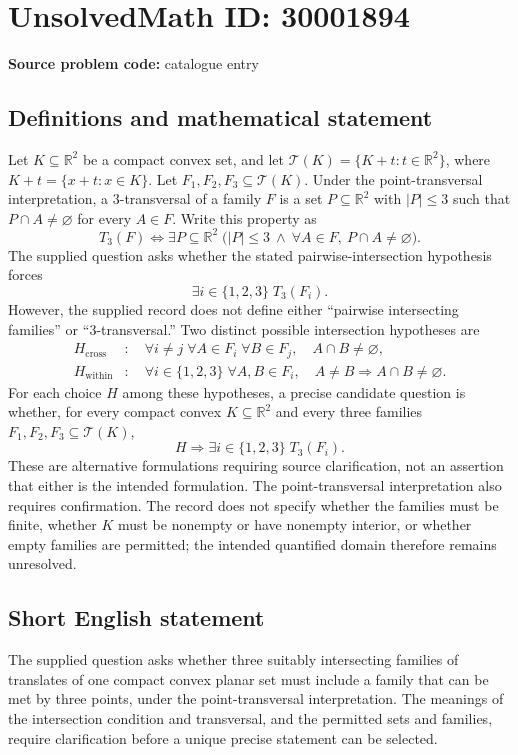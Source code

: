\documentclass[11pt]{article}
\newcommand{\R}{\mathbb{R}}
\begin{document}
\section*{UnsolvedMath ID: 30001894}
\textbf{Source problem code:} catalogue entry
\subsection{Definitions and mathematical statement}
Let \(K\subseteq\R^2\) be a compact convex set, and let \(\mathcal T(K)=\{K+t:t\in\R^2\}\), where \(K+t=\{x+t:x\in K\}\). Let \(F_1,F_2,F_3\subseteq\mathcal T(K)\). Under the point-transversal interpretation, a \(3\)-transversal of a family \(F\) is a set \(P\subseteq\R^2\) with \(|P|\leq 3\) such that \(P\cap A\neq\varnothing\) for every \(A\in F\). Write this property as
\[
T_3(F)\iff\exists P\subseteq\R^2\;\bigl(|P|\leq3\ \land\ \forall A\in F,\ P\cap A\neq\varnothing\bigr).
\]
The supplied question asks whether the stated pairwise-intersection hypothesis forces
\[
\exists i\in\{1,2,3\}\;T_3(F_i).
\]
However, the supplied record does not define either ``pairwise intersecting families'' or ``\(3\)-transversal.'' Two distinct possible intersection hypotheses are
\[
\begin{aligned}
H_{\mathrm{cross}}&:\quad
\forall i\neq j\;\forall A\in F_i\;\forall B\in F_j,
\quad A\cap B\neq\varnothing,\\
H_{\mathrm{within}}&:\quad
\forall i\in\{1,2,3\}\;\forall A,B\in F_i,
\quad A\neq B\Longrightarrow A\cap B\neq\varnothing.
\end{aligned}
\]
For each choice \(H\) among these hypotheses, a precise candidate question is whether, for every compact convex \(K\subseteq\R^2\) and every three families \(F_1,F_2,F_3\subseteq\mathcal T(K)\),
\[
H\Longrightarrow\exists i\in\{1,2,3\}\;T_3(F_i).
\]
These are alternative formulations requiring source clarification, not an assertion that either is the intended formulation. The point-transversal interpretation also requires confirmation. The record does not specify whether the families must be finite, whether \(K\) must be nonempty or have nonempty interior, or whether empty families are permitted; the intended quantified domain therefore remains unresolved.
\subsection{Short English statement}
The supplied question asks whether three suitably intersecting families of translates of one compact convex planar set must include a family that can be met by three points, under the point-transversal interpretation. The meanings of the intersection condition and transversal, and the permitted sets and families, require clarification before a unique precise statement can be selected.
\end{document}
